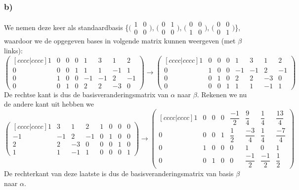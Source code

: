 \documentclass[lineaire_algebra_oplossingen.tex]{subfiles}
\begin{document}
\subsubsection*{b)}
We nemen deze keer als standaardbasis \{$\bigl(
\begin{smallmatrix}
1&0\\ 0&0
\end{smallmatrix}
\bigr)$,
$\bigl(
\begin{smallmatrix}
0&1\\ 0&0
\end{smallmatrix}
\bigr)$,
$\bigl(
\begin{smallmatrix}
0&0\\ 1&0
\end{smallmatrix}
\bigr)$,
$\bigl(
\begin{smallmatrix}
0&0\\ 0&1
\end{smallmatrix}
\bigr)$\}, waardoor we de opgegeven bases in volgende matrix kunnen weergeven (met $\beta$ links):
\[
\begin{pmatrix}[cccc|cccc]
1 & 0 & 0 & 0 & 1 & 3 & 1 & 2\\
0 & 0 & 0 & 1 & 1 & 1 & -1 & 1\\
0 & 1 & 0 & 0 & -1 & -1 & 2 & -1\\
0 & 0 & 1 & 0 & 2 & 2 & -3 & 0
\end{pmatrix}
\longrightarrow
\begin{pmatrix}[cccc|cccc]
1 & 0 & 0 & 0 & 1 & 3 & 1 & 2\\
0 & 1 & 0 & 0 & -1 & -1 & 2 & -1\\
0 & 0 & 1 & 0 & 2 & 2 & -3 & 0\\
0 & 0 & 0 & 1 & 1 & 1 & -1 & 1
\end{pmatrix}
\]
De rechtse kant is dus de basisveranderingsmatrix van $\alpha$ naar $\beta$. Rekenen we nu de andere kant uit hebben we
\[
\begin{pmatrix}[cccc|cccc]
1 & 3 & 1 & 2 & 1 & 0 & 0 & 0\\
-1 & -1 & 2 & -1 & 0 & 1 & 0 & 0\\
2 & 2 & -3 & 0 & 0 & 0 & 1 & 0\\
1 & 1 & -1 & 1 & 0 & 0 & 0 & 1
\end{pmatrix}
\longrightarrow
\begin{pmatrix}[cccc|cccc]
1 & 0 & 0 & 0 & \dfrac{-1}{2} & \dfrac{9}{4}  & \dfrac{1}{4}  & \dfrac{13}{4} \\[8pt]
0 & 0 & 0 & 1 & \dfrac{1}{2}  & \dfrac{-3}{4} & \dfrac{1}{4}  & \dfrac{-7}{4} \\[10pt]
0 & 1 & 0 & 0 & 0             & 1             & 0             &  1 \\[4pt]
0 & 0 & 1 & 0 & 0             & \dfrac{-1}{2} & \dfrac{-1}{2} & \dfrac{1}{2}
\end{pmatrix}
\]
De rechterkant van deze laatste is dus de basisveranderingsmatrix van basis $\beta$ naar $\alpha$.
\end{document}
